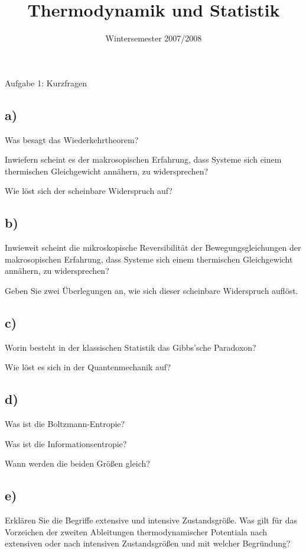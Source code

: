 

\subject{TuS}
\title{Thermodynamik und Statistik}
\date{
    Wintersemester 2007/2008
}



\maketitle
\thispagestyle{empty}
\newpage

\begin{aufgabe}{Aufgabe 1: Kurzfragen}
    \subsection{a)}
    Was besagt das Wiederkehrtheorem?

    Inwiefern scheint es der makrosopischen Erfahrung,
    dass Systeme sich einem thermischen Gleichgewicht annähern,
    zu widersprechen?

    Wie löst sich der scheinbare Widerspruch auf?


    \subsection{b)}
    Inwieweit scheint die mikroskopische Reversibilität der Bewegungsgleichungen der makrosopischen Erfahrung,
    dass Systeme sich einem thermischen Gleichgewicht annähern,
    zu widersprechen?

    Geben Sie zwei Überlegungen an,
    wie sich dieser scheinbare Widerspruch auflöst.

    \subsection{c)}
    Worin besteht in der klassischen Statistik das Gibbs'sche Paradoxon?

    Wie löst es sich in der Quantenmechanik auf?

    \subsection{d)}
    Was ist die Boltzmann-Entropie?

    Was ist die Informationsentropie?

    Wann werden die beiden Größen gleich?

    \subsection{e)}
    Erklären Sie die Begriffe extensive und intensive Zustandsgröße.
    Was gilt für das Vorzeichen der zweiten Ableitungen thermodynamischer Potentiala nach extensiven oder nach intensiven Zustandsgrößen und mit welcher Begründung?


\end{aufgabe}

